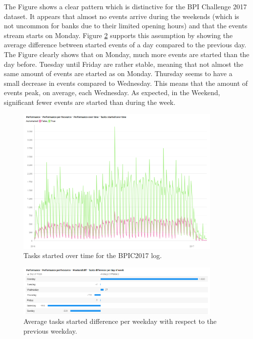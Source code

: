The Figure shows a clear pattern which is distinctive for the BPI Challenge 2017 dataset. It appears that almost no events arrive during the weekends (which is not uncommon for banks due to their limited opening hours) and that the events stream starts on Monday. Figure \ref{fig:dayofweek} supports this assumption by showing the average difference between started events of a day compared to the previous day. The Figure clearly shows that on Monday, much more events are started than the day before. Tuesday until Friday are rather stable, meaning that not almost the same amount of events are started as on Monday. Thursday seems to have a small decrease in events compared to Wednesday. This means that the amount of events peak, on average, each Wednesday. As expected, in the Weekend, significant fewer events are started than during the week. 

\begin{figure}[h]
	\centering
    \includegraphics[width=0.9\textwidth]{figures/tasks_started.png}
    \caption{Tasks started over time for the BPIC2017 log.}
    \label{fig:tasks_started}
\end{figure}

\begin{figure}[h]
	\centering
    \includegraphics[width=0.9\textwidth]{figures/dayofweek.png}
    \caption{Average tasks started difference per weekday with respect to the previous weekday.}
    \label{fig:dayofweek}
\end{figure}


